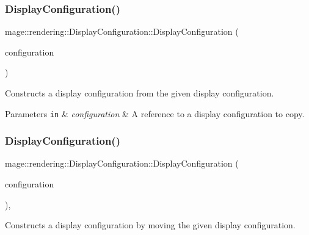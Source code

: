 \subsubsection{\texorpdfstring{Display\+Configuration()}{DisplayConfiguration()}\hspace{0.1cm}{\footnotesize\ttfamily [2/3]}}
{\footnotesize\ttfamily mage\+::rendering\+::\+Display\+Configuration\+::\+Display\+Configuration (\begin{DoxyParamCaption}\item[{const \mbox{\hyperlink{classmage_1_1rendering_1_1_display_configuration}{Display\+Configuration}} \&}]{configuration }\end{DoxyParamCaption})\hspace{0.3cm}{\ttfamily [default]}}

Constructs a display configuration from the given display configuration.


\begin{DoxyParams}[1]{Parameters}
\mbox{\tt in}  & {\em configuration} & A reference to a display configuration to copy. \\
\hline
\end{DoxyParams}
\mbox{\label{classmage_1_1rendering_1_1_display_configuration_a9c691b88024f24fa778db90c9f1b9416}} 
\subsubsection{\texorpdfstring{Display\+Configuration()}{DisplayConfiguration()}\hspace{0.1cm}{\footnotesize\ttfamily [3/3]}}
{\footnotesize\ttfamily mage\+::rendering\+::\+Display\+Configuration\+::\+Display\+Configuration (\begin{DoxyParamCaption}\item[{\mbox{\hyperlink{classmage_1_1rendering_1_1_display_configuration}{Display\+Configuration}} \&\&}]{configuration }\end{DoxyParamCaption})\hspace{0.3cm}{\ttfamily [default]}, {\ttfamily [noexcept]}}

Constructs a display configuration by moving the given display configuration.


